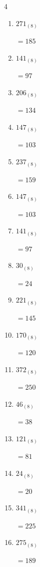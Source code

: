 \begin{multicols}{4}
\begin{enumerate}
        $=97$

  \item $271_{(8)}$

        $=185$

\columnbreak %

  \item $141_{(8)}$

        $=97$

  \item $206_{(8)}$

        $=134$

  \item $147_{(8)}$

        $=103$

  \item $237_{(8)}$

        $=159$

  \item $147_{(8)}$

        $=103$

  \item $141_{(8)}$

        $=97$

  \item $30_{(8)}$

        $=24$

  \item $221_{(8)}$

        $=145$

  \item $170_{(8)}$

        $=120$

  \item $372_{(8)}$

        $=250$

  \item $46_{(8)}$

        $=38$

  \item $121_{(8)}$

        $=81$

  \item $24_{(8)}$

        $=20$

  \item $341_{(8)}$

        $=225$

  \item $275_{(8)}$

        $=189$


\end{enumerate}
\end{multicols}

